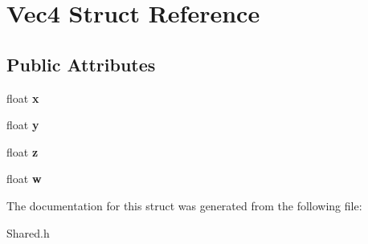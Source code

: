 \hypertarget{structVec4}{
\section{Vec4 Struct Reference}
\label{structVec4}
}
\subsection*{Public Attributes}
\begin{DoxyCompactItemize}
\item 
\hypertarget{structVec4_a3d9a7d18ac661965798b0c5bc32c56df}{
float {\bfseries x}}
\label{structVec4_a3d9a7d18ac661965798b0c5bc32c56df}

\item 
\hypertarget{structVec4_a21c69aa0ef01a4ea985966c5527bbd69}{
float {\bfseries y}}
\label{structVec4_a21c69aa0ef01a4ea985966c5527bbd69}

\item 
\hypertarget{structVec4_a60d0b599c7104dd0c6e2ae0cc4cd0310}{
float {\bfseries z}}
\label{structVec4_a60d0b599c7104dd0c6e2ae0cc4cd0310}

\item 
\hypertarget{structVec4_a37bee38ceffb78ccd3875ebf82bd84b2}{
float {\bfseries w}}
\label{structVec4_a37bee38ceffb78ccd3875ebf82bd84b2}

\end{DoxyCompactItemize}


The documentation for this struct was generated from the following file:\begin{DoxyCompactItemize}
\item 
Shared.h\end{DoxyCompactItemize}
